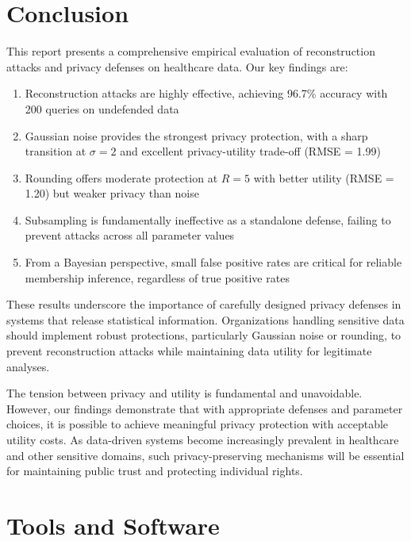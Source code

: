 \documentclass[11pt,letterpaper]{article}
\begin{document}
\section{Conclusion}

This report presents a comprehensive empirical evaluation of reconstruction attacks and privacy defenses on healthcare data. Our key findings are:

\begin{enumerate}[leftmargin=*]
    \item Reconstruction attacks are highly effective, achieving 96.7\% accuracy with 200 queries on undefended data
    
    \item Gaussian noise provides the strongest privacy protection, with a sharp transition at $\sigma = 2$ and excellent privacy-utility trade-off (RMSE = 1.99)
    
    \item Rounding offers moderate protection at $R = 5$ with better utility (RMSE = 1.20) but weaker privacy than noise
    
    \item Subsampling is fundamentally ineffective as a standalone defense, failing to prevent attacks across all parameter values
    
    \item From a Bayesian perspective, small false positive rates are critical for reliable membership inference, regardless of true positive rates
\end{enumerate}

These results underscore the importance of carefully designed privacy defenses in systems that release statistical information. Organizations handling sensitive data should implement robust protections, particularly Gaussian noise or rounding, to prevent reconstruction attacks while maintaining data utility for legitimate analyses.

The tension between privacy and utility is fundamental and unavoidable. However, our findings demonstrate that with appropriate defenses and parameter choices, it is possible to achieve meaningful privacy protection with acceptable utility costs. As data-driven systems become increasingly prevalent in healthcare and other sensitive domains, such privacy-preserving mechanisms will be essential for maintaining public trust and protecting individual rights.

\section*{Tools and Software}
\end{document}

